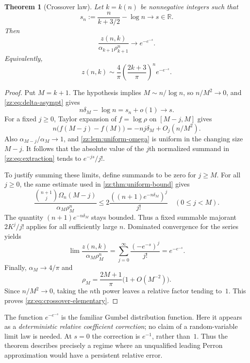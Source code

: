 \documentclass[11pt,a4paper]{article}
\newtheorem{theorem}{Theorem}[section]
\theoremstyle{definition}
\newcommand{\Om}{\Omega}
\newcommand{\R}{\mathbb{R}}
\begin{document}
\begin{theorem}[Crossover law]
\label{zz:thm:crossover}
Let $k=k(n)$ be nonnegative integers such that
\begin{equation}\label{zz:eq:crossover-hyp}
 s_n:=\frac{n}{k+3/2}-\log n\longrightarrow s\in\R.
\end{equation}
Then
\begin{equation}\label{zz:eq:crossover-limit}
 \frac{z(n,k)}{\alpha_{k+1}\rho_{k+1}^n}\longrightarrow e^{-e^{-s}}.
\end{equation}
Equivalently,
\begin{equation}\label{zz:eq:crossover-elementary}
 z(n,k)\sim\frac4\pi
 \left(\frac{2k+3}{\pi}\right)^n e^{-e^{-s}}.
\end{equation}
\end{theorem}
\begin{proof}
Put $M=k+1$.  The hypothesis implies $M\sim n/\log n$, so
$n/M^2\to0$, and \eqref{zz:eq:delta-asympt} gives
\[
 n\delta_M-\log n=s_n+o(1)\to s.
\]
For a fixed $j\ge0$, Taylor expansion of $f=\log\rho$ on
$[M-j,M]$ gives
\[
 n\bigl(f(M-j)-f(M)\bigr)
 =-nj\delta_M+O_j(n/M^2).
\]
Also $\alpha_{M-j}/\alpha_M\to1$, and
\cref{zz:lem:uniform-omega} is uniform in the changing size $M-j$.
It follows that the absolute value of the $j$th normalized summand in
\eqref{zz:eq:extraction} tends to $e^{-js}/j!$.

To justify summing these limits, define summands to be zero for $j\ge M$.
For all $j\ge0$, the same estimate used in \cref{zz:thm:uniform-bound} gives
\[
 \frac{\binom{n+1}{j}\Om_n(M-j)}{\alpha_M\rho_M^n}
 \le2\frac{((n+1)e^{-n\delta_M})^j}{j!}
 \quad(0\le j<M).
\]
The quantity $(n+1)e^{-n\delta_M}$ stays bounded.  Thus a fixed summable
majorant $2K^j/j!$ applies for all sufficiently large $n$.
Dominated convergence for the series yields
\[
 \lim\frac{z(n,k)}{\alpha_M\rho_M^n}
 =\sum_{j=0}^\infty\frac{(-e^{-s})^j}{j!}=e^{-e^{-s}}.
\]
Finally, $\alpha_M\to4/\pi$ and
\[
 \rho_M=\frac{2M+1}{\pi}\bigl(1+O(M^{-2})\bigr).
\]
Since $n/M^2\to0$, taking the $n$th power leaves a relative factor tending
to~$1$.  This proves \eqref{zz:eq:crossover-elementary}.
\end{proof}

The function $e^{-e^{-s}}$ is the familiar Gumbel distribution function.
Here it appears as a \emph{deterministic relative coefficient correction};
no claim of a random-variable limit law is needed.
At $s=0$ the correction is $e^{-1}$, rather than~$1$.
Thus the theorem describes precisely a regime where an unqualified leading
Perron approximation would have a persistent relative error.
\end{document}
